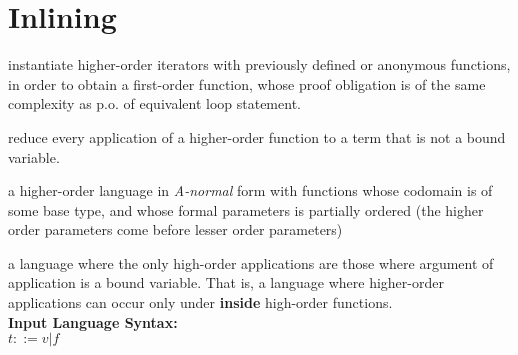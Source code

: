 \section{Inlining}
	
instantiate higher-order iterators with previously defined or anonymous functions, in order to obtain a first-order function, whose proof obligation is of the same complexity as p.o. of equivalent loop statement. 

\quad reduce every application of a higher-order function to a term that
is not a bound variable.

a higher-order language in \textit{A-normal} form with functions whose codomain is of some base type, and whose formal parameters is partially ordered (the higher order parameters come before lesser order parameters)   
 
  a language where the only high-order applications are those where
argument of application is a bound variable. That is, a language where
higher-order applications can occur only under \textbf{inside} high-order functions. \\

\noindent\textbf{Input Language Syntax:} \\

$ t ::= v | f $

 


 